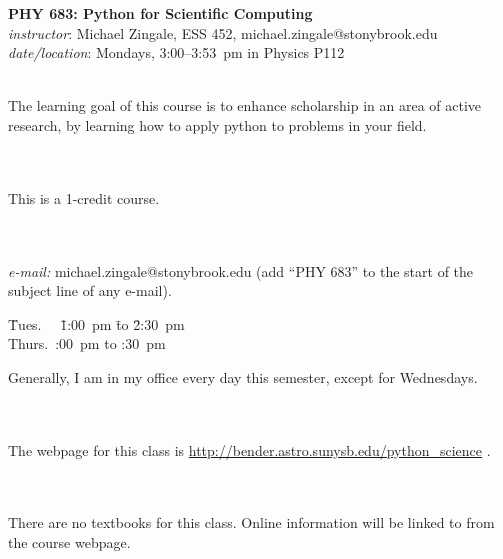 \documentclass[11pt]{article}
\begin{document}
\begin{center}
{\Large \bf PHY 683: Python for Scientific Computing} \\[0.25em]
{\em instructor}\/: Michael Zingale, ESS 452, michael.zingale@stonybrook.edu \\
{\em date/location}\/: Mondays, 3:00--3:53~pm in Physics P112
\end{center}

 \\
The learning goal of this course is to enhance scholarship in an area
of active research, by learning how to apply python to problems
in your field.

\ \\[-2mm]
 \\
This is a 1-credit course.


\ \\[-2mm]
  \\
{\em e-mail:} michael.zingale@stonybrook.edu ({add ``PHY 683'' to the
 start of the subject line of any e-mail}).
%
\begin{tabbing}
 \= Tues.~~  \=1:00~pm \=to \=2:30~pm \\
                              \> Thurs.\ :00~pm \>to :30~pm
\end{tabbing}
Generally, I am in my office every day this semester, except for Wednesdays.

\ \\[-2mm]
 \\
The webpage for this class is \url{http://bender.astro.sunysb.edu/python_science} .

\ \\[-2mm]
 \\
There are no textbooks for this class.  Online information
will be linked to from the course webpage.
\end{document}
